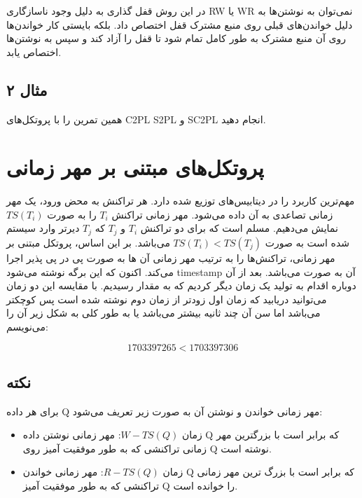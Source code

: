 \documentclass[a4paper]{article}
\begin{document}
در این روش قفل گذاری به دلیل وجود ناسازگاری RW یا WR نمی‌توان به نوشتن‌ها به
دلیل خواندن‌های قبلی روی منبع مشترک قفل اختصاص داد. بلکه بایستی کار خواندن‌ها
روی آن منبع مشترک به طور کامل تمام شود تا قفل را آزاد کند و سپس به نوشتن‌ها
اختصاص یابد.

\subsection*{مثال ۲}

همین تمرین را با پروتکل‌های C2PL S2PL و SC2PL انجام دهید.

\newpage

\section{پروتکل‌های مبتنی بر مهر زمانی }

مهم‌ترین کاربرد را در دیتابیس‌های توزیع شده دارد. هر تراکنش به محض ورود، یک مهر
زمانی تصاعدی به آن داده می‌شود. مهر زمانی تراکنش $T_i$ را به صورت $TS(T_i)$
نمایش می‌دهیم. مسلم است که برای دو تراکنش $T_i$ و $T_j$ که $T_j$ دیرتر وارد
سیستم شده است به صورت $TS(T_i) < TS(T_j)$ می‌باشد. بر این اساس، پروتکل مبتنی بر
مهر زمانی، تراکنش‌ها را به  ترتیب مهر زمانی آن ها به صورت پی در پی پذیر اجرا
می‌کند. اکنون که این برگه نوشته می‌شود timestamp آن به صورت 
می‌باشد.  بعد از آن دوباره اقدام به تولید یک زمان دیگر کردیم که به مقدار
 رسیدیم. با مقایسه این دو زمان می‌توانید دریابید که زمان اول
زودتر از زمان دوم نوشته شده است پس کوچکتر می‌باشد اما سن آن چند ثانیه بیشتر
می‌باشد یا به طور کلی به شکل زیر آن را می‌نویسم:

\begin{equation}
    1703397265 < 1703397306 
\end{equation}

\subsection*{نکته}

برای هر داده Q مهر زمانی خواندن و نوشتن آن به صورت زیر تعریف می‌شود:

\begin{itemize}
    \item زمان $W-TS(Q)$: مهر زمانی نوشتن داده Q که برابر است با بزرگترین مهر
    زمانی تراکنشی که به طور موفقیت آمیز روی Q نوشته است.
    \item زمان $R-TS(Q)$: مهر زمانی خواندن Q که برابر است با بزرگ ترین مهر زمانی
    تراکنشی که به طور موفقیت آمیز Q را خوانده است.
\end{itemize}
\end{document}
